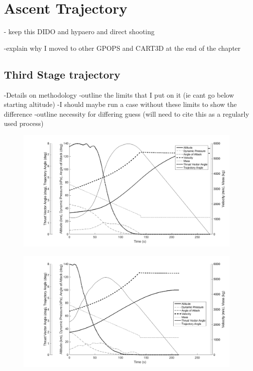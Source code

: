 
\cleardoublepage
\chapter{Ascent Trajectory}\label{chapter:numerical}


- keep this DIDO and hypaero and direct shooting

-explain why I moved to other GPOPS and CART3D at the end of the chapter



\section{Third Stage trajectory}
-Details on methodology
-outline the limits that I put on it (ie cant go below starting altitude)
-I should maybe run a case without these limits to show the difference
-outline necessity for differing guess (will need to cite this as a regularly used process)

\begin{figure}
\centering
\includegraphics[width=0.7\linewidth]{figures/5_Ascent/ThirdStageConstQ}
\caption{}
\label{fig:ThirdStageConstQ}
\end{figure}
\begin{figure}
\centering
\includegraphics[width=0.7\linewidth]{figures/5_Ascent/ThirdStage50kpaconstrained}
\caption{}
\label{fig:ThirdStage50kpaconstrained}
\end{figure}



